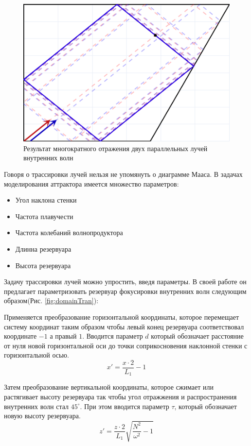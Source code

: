 \begin{figure}
    \centering
    \includegraphics[scale=0.8]{Figs/RayTracing.png}
    \caption{Результат многократного отражения двух параллельных лучей внутренних волн}
    \label{fig:RayTr}
\end{figure}

Говоря о трассировки лучей нельзя не упомянуть о диаграмме Мааса\cite{Maas1997}. В задачах моделирования аттрактора имеется множество параметров:

\begin{itemize}
    \item Угол наклона стенки
    \item Частота плавучести
    \item Частота колебаний волнопродуктора
    \item Длинна резервуара
    \item Высота резервуара
\end{itemize}

Задачу трассировки лучей можно упростить, введя параметры. В своей работе он предлагает параметризовать резервуар фокусировки внутренних волн следующим образом(Рис. \ref{fig:domainTran}):

Применяется преобразование горизонтальной координаты, которое перемещает систему координат таким образом чтобы левый конец резервуара соответствовал координате $-1$ а правый $1$. Вводится параметр $d$ который обозначает расстояние от нуля новой горизонтальной оси до точки соприкосновения наклонной стенки с горизонтальной осью.
\begin{equation}
    x'=\frac{x\cdot 2}{L_1}-1
    \label{eq:transformX}
\end{equation}

Затем преобразование вертикальной координаты, которое сжимает или растягивает высоту резервуара так чтобы угол отражжения и распространения внутренних волн стал $45^\circ$. При этом вводится параметр $\tau$, который обозначает новую высоту резервуара. 
\begin{equation}
    z'=\frac{z\cdot 2}{L_1}\sqrt{\frac{N^2}{\omega^2}-1}
    \label{eq:transformZ}
\end{equation}

